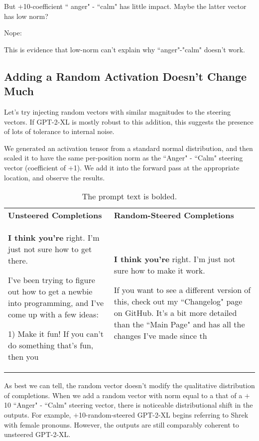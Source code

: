 \documentclass[10pt]{article}
\begin{document}
But $+$10-coefficient `` anger" - ``calm" has little impact. Maybe the latter vector has low norm?

Nope:


This is evidence that low-norm can't explain why ``anger"-"calm" doesn't work.

\subsection{Adding a Random Activation Doesn't Change Much}
Let's try injecting random vectors with similar magnitudes to the steering vectors. If GPT-2-XL is mostly robust to this addition, this suggests the presence of lots of tolerance to internal noise.

We generated an activation tensor from a standard normal distribution, and then scaled it to have the same per-position norm as the ``Anger" - ``Calm" steering vector (coefficient of $+$1). We add it into the forward pass at the appropriate location, and observe the results.


\begin{table}[h]
\centering
\vskip 0.1in
\caption{The prompt text is bolded.}
\vskip 0.1in
\begin{tabularx}{\linewidth}{XX}
\rowcolor{gray!20} \textbf{Unsteered Completions}&\textbf{Random-Steered Completions}\\
\textbf{I think you're} right. I'm just not sure how to get there.

\hfill

I've been trying to figure out how to get a newbie into programming, and I've come up with a few ideas:

\hfill

1) Make it fun! If you can't do something that's fun, then you

&\textbf{I think you're} right. I'm just not sure how to make it work.

\hfill

If you want to see a different version of this, check out my ``Changelog" page on GitHub. It's a bit more detailed than the ``Main Page" and has all the changes I've made since th
\end{tabularx}
\label{tab:table2}
\end{table}


As best we can tell, the random vector doesn't modify the qualitative distribution of completions. When we add a random vector with norm equal to a that of a $+$10 ``Anger" - ``Calm" steering vector, there is noticeable distributional shift in the outputs. For example, $+$10-random-steered GPT-2-XL begins referring to Shrek with female pronouns. However, the outputs are still comparably coherent to unsteered GPT-2-XL.
\end{document}
